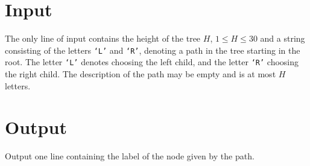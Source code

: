 \section*{Input}
The only line of input contains the height of the tree $H$, $1\le H\le 30$ and a string
consisting of the letters {\tt `L'} and {\tt `R'}, denoting a path in the tree
starting in the root. The letter {\tt `L'} denotes choosing the left child, and the letter {\tt `R'}
choosing the right child. The description of the path may be empty and is at most $H$ letters.

\section*{Output}
Output one line containing the label of the node given by the path.
